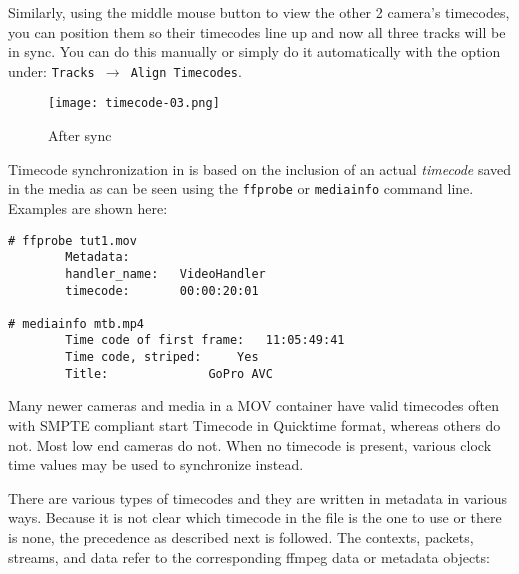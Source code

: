 Similarly, using the middle mouse button to view the other 2 camera’s timecodes, you can position them  so their timecodes line up and now all three tracks will be in sync.  You can do this manually or simply do it automatically with the option under: \texttt{Tracks  $\rightarrow$  Align Timecodes}.

\begin{figure}[ht]
	\centering
	\texttt{[image: timecode-03.png]}
	\caption{After sync}
	\label{fig:timecode-03}
\end{figure}

Timecode synchronization in \CGG{} is based on the inclusion of an actual \textit{timecode} saved in
the media as can be seen using the \texttt{ffprobe} or \texttt{mediainfo} command line. Examples are shown here:

\begin{lstlisting}[style=sh]
# ffprobe tut1.mov
		Metadata:
		handler_name:	VideoHandler
		timecode:		00:00:20:01

# mediainfo mtb.mp4
		Time code of first frame:	11:05:49:41
		Time code, striped:		Yes
		Title:				GoPro AVC
\end{lstlisting}

Many newer cameras and media in a MOV container have valid timecodes often with SMPTE
compliant start Timecode in Quicktime format, whereas others do not. Most low end cameras do not.
When no timecode is present, various clock time values may be used to synchronize instead.

There are various types of timecodes and they are written in metadata in various ways. Because it is not clear which timecode in the file is the one to use or there is none, the precedence as described next is followed. The contexts, packets, streams, and data refer to the corresponding ffmpeg data or metadata objects:

